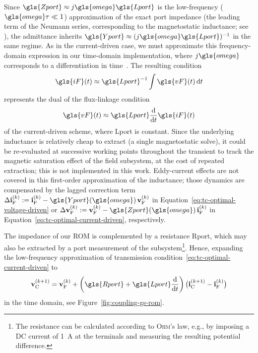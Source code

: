 Since $\gls{Zport} \approx j\gls{omega}\gls{Lport}$ is the low-frequency ($\gls{omega} \tau \ll 1$) approximation of the exact port impedance (the leading term of the Neumann series, corresponding to the magnetostatic inductance; see \cite{Garcia2017}), the admittance inherits $\gls{Yport} \approx (j\gls{omega}\gls{Lport})^{-1}$ in the same regime.
As in the current-driven case, we must approximate this frequency-domain expression in our time-domain implementation, where $j\gls{omega}$ corresponds to a differentiation in time~\cite{Garcia2017}.
The resulting condition
\begin{equation*}
    \gls{iF}(t) \approx \gls{Lport}^{-1} \int \gls{vF}(t) \, \textrm{d}t
\end{equation*} %
represents the dual of the flux-linkage condition
\begin{equation*}
    \gls{vF}(t) \approx \gls{Lport} \frac{\mathrm{d}}{\mathrm{d}t} \gls{iF}(t)
\end{equation*}
of the current-driven scheme, where \gls{Lport} is constant.
Since the underlying inductance is relatively cheap to extract (a single magnetostatic solve), it could be re-evaluated at successive working points throughout the transient to track the magnetic saturation effect of the field subsystem, at the cost of repeated extraction; this is not implemented in this work. Eddy-current effects are not covered in this first-order approximation of the inductance; those dynamics are compensated by the lagged correction term $\Delta \mathbf{i}_{\text{F}}^{(k)} := \mathbf{i}_{\text{F}}^{(k)} - \gls{Yport}(\gls{omega})\, \mathbf{v}_{\text{F}}^{(k)}$ in Equation~\eqref{eq:tc-optimal-voltage-driven} or $\Delta \mathbf{v}_{\text{F}}^{(k)} := \mathbf{v}_{\text{F}}^{(k)} - \gls{Zport}(\gls{omega})\, \mathbf{i}_{\text{F}}^{(k)}$ in Equation~\eqref{eq:tc-optimal-current-driven}, respectively.

The impedance of our ROM is complemented by a resistance \gls{Rport}, which may also be extracted by a port measurement of the subsystem\footnote{The resistance can be calculated according to \textsc{Ohm}'s law, e.g., by imposing a DC current of \qty{1}{\ampere} at the terminals and measuring the resulting potential difference.}. Hence, expanding the low-frequency approximation of transmission condition~\eqref{eq:tc-optimal-current-driven} to
\begin{equation*}
    \mathbf{v}_{\text{C}}^{(k+1)} = \mathbf{v}_{\text{F}}^{(k)} + \bigg( \gls{Rport} + \gls{Lport} \frac{\mathrm{d}}{\mathrm{d}t} \bigg)\, \big( \mathbf{i}_{\text{C}}^{(k+1)} - \mathbf{i}_{\text{F}}^{(k)} \big)
\end{equation*}
in the time domain, see Figure~\ref{fig:coupling-gs-rom}.

